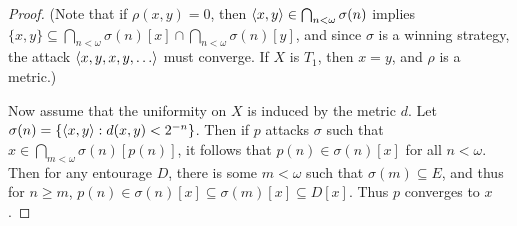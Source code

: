 \begin{proof}
  (Note that if $\rho(x,y)=0$, then $\langle x,y\rangle\in\bigcap_{n<\omega}\sigma(n)$ implies $\{x,y\}\subseteq\bigcap_{n<\omega}\sigma(n)[x]\cap\bigcap_{n<\omega}\sigma(n)[y]$, and since $\sigma$ is a winning strategy, the attack $\<x,y,x,y,\dots\>$ must converge. If $X$ is $T_1$, then $x=y$, and $\rho$ is a metric.)

  


  Now assume that the uniformity on $X$ is induced by the metric $d$. Let $\sigma(n)=\{\langle x,y\rangle:d(x,y)<2^{-n}\}$. Then if $p$ attacks $\sigma$ such that $x\in\bigcap_{m<\omega}\sigma(n)[p(n)]$, it follows that $p(n)\in\sigma(n)[x]$ for all $n<\omega$. Then for any entourage $D$, there is some $m<\omega$ such that $\sigma(m)\subseteq E$, and thus for $n\geq m$, $p(n)\in\sigma(n)[x]\subseteq \sigma(m)[x]\subseteq D[x]$. Thus $p$ converges to $x$.
\end{proof}












